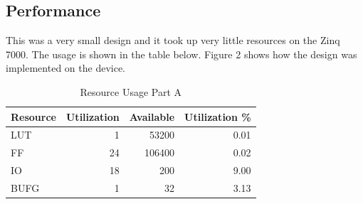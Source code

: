 \documentclass[letterpaper, 10 pt, conference]{IEEEconf}  %
\begin{document}
\subsection{Performance}
This was a very small design and it took up very little resources on the Zinq 7000. The usage is shown in the table below. Figure 2 shows how the design was implemented on the device.
\begin{table}[H]
\centering
\caption{Resource Usage Part A}
\label{table_example}
\begin{tabular}{|l|r|r|r|}
\hline
\rowcolor[HTML]{EFEFEF} 
Resource & \multicolumn{1}{l|}{\cellcolor[HTML]{EFEFEF}Utilization} & \multicolumn{1}{l|}{\cellcolor[HTML]{EFEFEF}Available} & \multicolumn{1}{l|}{\cellcolor[HTML]{EFEFEF}Utilization \%} \\ \hline
LUT      & 1                                                        & 53200                                                  & 0.01                                                        \\ \hline
FF       & 24                                                       & 106400                                                 & 0.02                                                        \\ \hline
IO       & 18                                                       & 200                                                    & 9.00                                                        \\ \hline
BUFG     & 1                                                        & 32                                                     & 3.13                                                        \\ \hline
\end{tabular}
\end{table}
\end{document}
